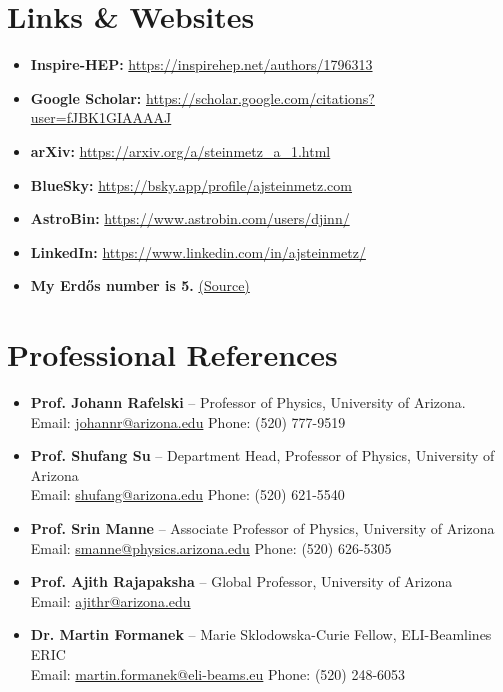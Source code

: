 \documentclass[11pt]{article}
\begin{document}
\section*{Links \& Websites}
\begin{itemize}[leftmargin=*,nosep]
    \item \textbf{Inspire-HEP:} \href{https://inspirehep.net/authors/1796313}{https://inspirehep.net/authors/1796313}
    \item \textbf{Google Scholar:} \href{https://scholar.google.com/citations?user=fJBK1GIAAAAJ}{https://scholar.google.com/citations?user=fJBK1GIAAAAJ}
    \item \textbf{arXiv:} \href{https://arxiv.org/a/steinmetz\_a\_1.html}{https://arxiv.org/a/steinmetz\_a\_1.html}
    \item \textbf{BlueSky:} \href{https://bsky.app/profile/ajsteinmetz.com}{https://bsky.app/profile/ajsteinmetz.com}
    \item \textbf{AstroBin:} \href{https://www.astrobin.com/users/djinn/}{https://www.astrobin.com/users/djinn/}
    \item \textbf{LinkedIn:} \href{https://www.linkedin.com/in/ajsteinmetz/}{https://www.linkedin.com/in/ajsteinmetz/}
    \item \textbf{My Erd\H{o}s number is 5.} \href{https://mathscinet.ams.org/mathscinet/freetools/collab-dist?source=1443426\&target=189017}{(Source)}
\end{itemize}


\section*{Professional References}
{\normalsize
\begin{itemize}[leftmargin=*,nosep,label={\textbullet}]
    \item \textbf{Prof. Johann Rafelski} -- Professor of Physics, University of Arizona.\\
    Email: \href{mailto:johannr@arizona.edu}{johannr@arizona.edu} \quad Phone: (520) 777-9519
    \item \textbf{Prof. Shufang Su} -- Department Head, Professor of Physics, University of Arizona\\
    Email: \href{mailto:shufang@arizona.edu}{shufang@arizona.edu} \quad Phone: (520) 621-5540
    \item \textbf{Prof. Srin Manne} -- Associate Professor of Physics, University of Arizona\\
    Email: \href{mailto:smanne@physics.arizona.edu}{smanne@physics.arizona.edu} \quad Phone: (520) 626-5305
    \item \textbf{Prof. Ajith Rajapaksha} -- Global Professor, University of Arizona\\
    Email: \href{mailto:ajithr@arizona.edu}{ajithr@arizona.edu}
    \item \textbf{Dr. Martin Formanek} -- Marie Sklodowska-Curie Fellow, ELI-Beamlines ERIC\\
    Email: \href{mailto:martin.formanek@eli-beams.eu}{martin.formanek@eli-beams.eu} \quad Phone: (520) 248-6053
\end{itemize}
}
\end{document}

